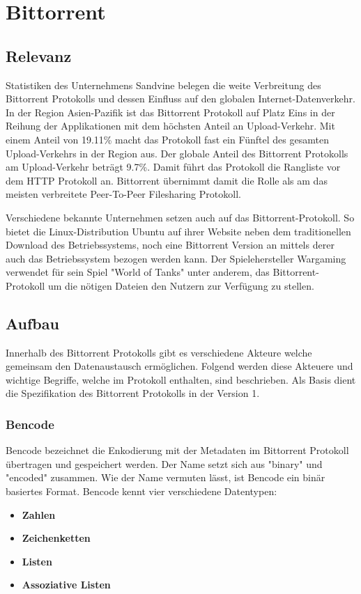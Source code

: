 \chapter{Bittorrent}
\label{cha:Bittorrent}

\section{Relevanz}
Statistiken des Unternehmens Sandvine belegen die weite Verbreitung des Bittorrent Protokolls und dessen Einfluss auf den globalen Internet-Datenverkehr.
In der Region Asien-Pazifik ist das Bittorrent Protokoll auf Platz Eins in der Reihung der Applikationen mit dem höchsten Anteil an Upload-Verkehr. Mit einem Anteil von 19.11\%  macht das Protokoll fast ein Fünftel des gesamten Upload-Verkehrs in der Region aus. Der globale Anteil des Bittorrent Protokolls am Upload-Verkehr beträgt 9.7\%. Damit führt das Protokoll die Rangliste vor dem HTTP Protokoll an.
Bittorrent übernimmt damit die Rolle als am das meisten verbreitete Peer-To-Peer Filesharing Protokoll.

Verschiedene bekannte Unternehmen setzen auch auf das Bittorrent-Protokoll. So bietet die Linux-Distribution Ubuntu auf ihrer Website neben dem traditionellen Download des Betriebssystems, noch eine Bittorrent Version an mittels derer auch das Betriebssystem bezogen werden kann. Der Spielehersteller Wargaming verwendet für sein Spiel "World of Tanks" unter anderem, das Bittorrent-Protokoll um die nötigen Dateien den Nutzern zur Verfügung zu stellen.

\section{Aufbau}
Innerhalb des Bittorrent Protokolls gibt es verschiedene Akteure welche gemeinsam den Datenaustausch ermöglichen. Folgend werden diese Akteuere und wichtige Begriffe, welche im Protokoll enthalten, sind beschrieben. Als Basis dient die Spezifikation des Bittorrent Protokolls in der Version 1. 

\subsection{Bencode}
Bencode bezeichnet die Enkodierung mit der Metadaten im Bittorrent Protokoll übertragen und gespeichert werden. Der Name setzt sich aus "binary" und "encoded" zusammen. Wie der Name vermuten lässt, ist Bencode ein binär basiertes Format. Bencode kennt vier verschiedene Datentypen:
\begin{itemize}
    \item \textbf{Zahlen}
    \item \textbf{Zeichenketten}
    \item \textbf{Listen}
    \item \textbf{Assoziative Listen}
\end{itemize}

